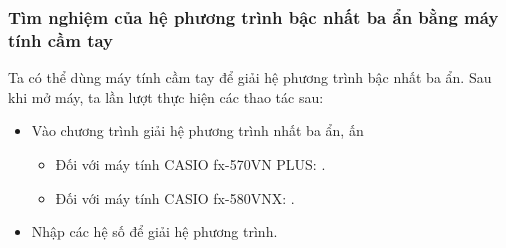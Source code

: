\subsubsection{Tìm nghiệm của hệ phương trình bậc nhất ba ẩn bằng máy tính cầm tay}
\begin{tomtat}
	Ta có thể dùng máy tính cầm tay để giải hệ phương trình bậc nhất ba ẩn. Sau khi mở máy, ta lần lượt thực hiện các thao tác sau:
	\begin{itemize}
		\item Vào chương trình giải hệ phương trình  nhất ba ẩn, ấn
		\begin{itemize}
			\item Đối với máy tính CASIO fx-570VN PLUS:   . 
			\item Đối với máy tính CASIO fx-580VNX:    . 
		\end{itemize}
	\item Nhập các hệ số để giải hệ phương trình.
	\end{itemize}
\end{tomtat}
